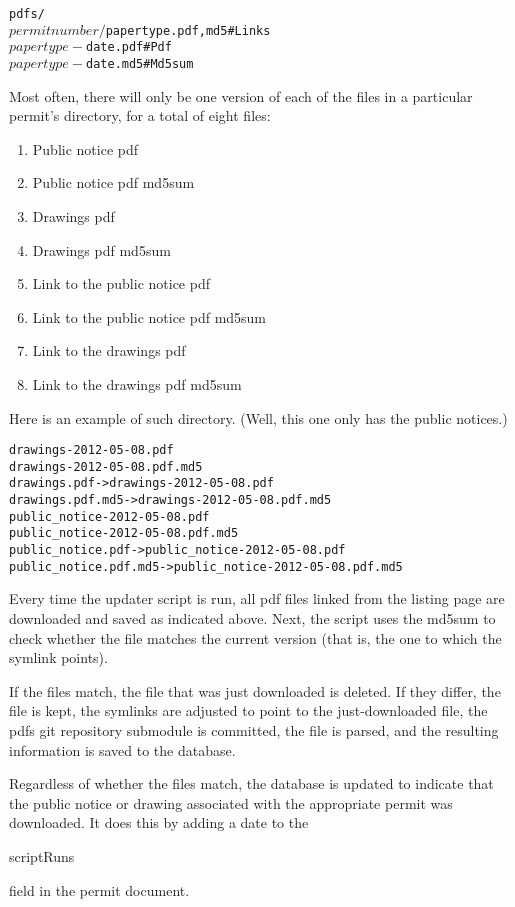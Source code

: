 \documentclass{article}
\begin{document}
\begin{alltt}
pdfs/
  ${permitnumber}/
    ${papertype}.{pdf,md5} # Links
    ${papertype}-${date}.pdf # Pdf
    ${papertype}-${date}.md5 # Md5sum
\end{alltt}

Most often, there will only be one version of each of the files in a
particular permit's directory, for a total of eight files:
\begin{enumerate}
\item Public notice pdf
\item Public notice pdf md5sum
\item Drawings pdf
\item Drawings pdf md5sum
\item Link to the public notice pdf
\item Link to the public notice pdf md5sum
\item Link to the drawings pdf
\item Link to the drawings pdf md5sum
\end{enumerate}

Here is an example of such directory. (Well, this one only has the public
notices.)

\begin{alltt}
drawings-2012-05-08.pdf
drawings-2012-05-08.pdf.md5
drawings.pdf -> drawings-2012-05-08.pdf
drawings.pdf.md5 -> drawings-2012-05-08.pdf.md5
public\_notice-2012-05-08.pdf
public\_notice-2012-05-08.pdf.md5
public\_notice.pdf -> public_notice-2012-05-08.pdf
public\_notice.pdf.md5 -> public_notice-2012-05-08.pdf.md5
\end{alltt}

Every time the updater script is run, all pdf files linked from the listing
page are downloaded and saved as indicated above. Next, the script uses the
md5sum to check whether the file matches the current version (that is, the
one to which the symlink points).

If the files match, the file that was just downloaded is deleted. If they
differ, the file is kept, the symlinks are adjusted to point to the
just-downloaded file, the pdfs git repository submodule is committed,
the file is parsed, and the resulting information is saved to the database.

Regardless of whether the files match, the database is updated to indicate
that the public notice or drawing associated with the appropriate permit
was downloaded. It does this by adding a date to the
\begin{texttt}scriptRuns\end{texttt} field in the permit document.
\end{document}
